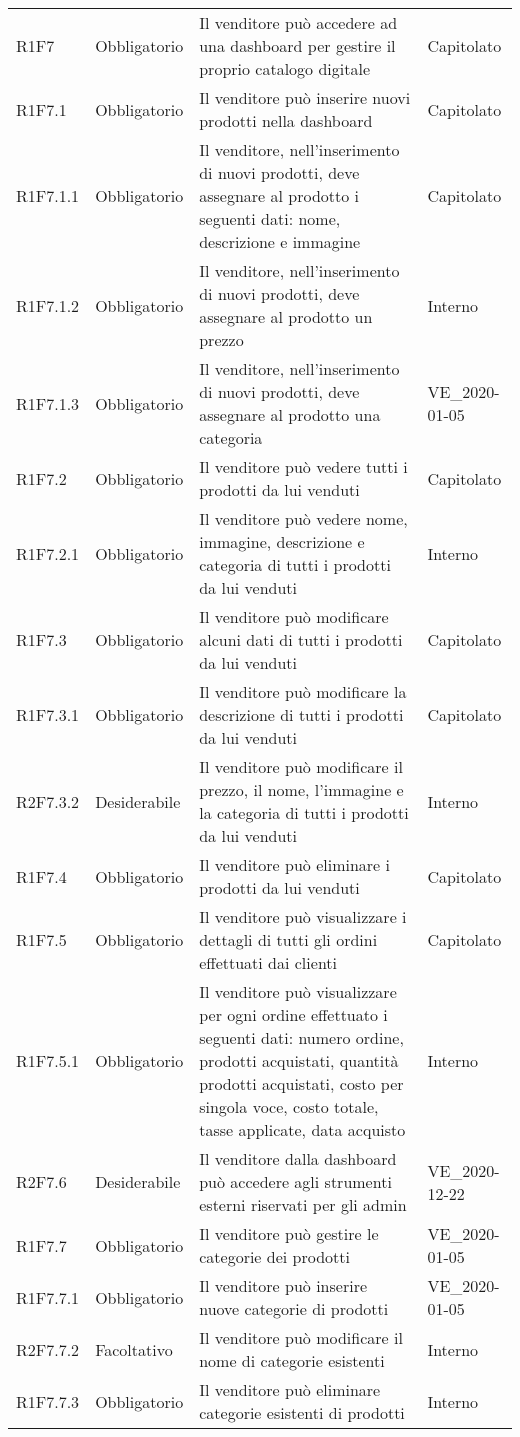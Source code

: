 {\begin{longtable}{C{2.5cm} C{2.8cm} C{6.7cm} C{2.5cm}}
R1F7 & Obbligatorio & Il venditore può accedere ad una dashboard per gestire il proprio catalogo digitale & Capitolato \\
R1F7.1 & Obbligatorio & Il venditore può inserire nuovi prodotti nella dashboard & Capitolato \\
R1F7.1.1 & Obbligatorio & Il venditore, nell'inserimento di nuovi prodotti, deve assegnare al prodotto i seguenti dati: nome, descrizione e immagine & Capitolato \\
R1F7.1.2 & Obbligatorio & Il venditore, nell'inserimento di nuovi prodotti, deve assegnare al prodotto un prezzo & Interno \\ 
R1F7.1.3 & Obbligatorio & Il venditore, nell'inserimento di nuovi prodotti, deve assegnare al prodotto una categoria & VE\_2020-01-05 \\ 
R1F7.2 & Obbligatorio & Il venditore può vedere tutti i prodotti da lui venduti & Capitolato \\
R1F7.2.1 & Obbligatorio & Il venditore può vedere nome, immagine, descrizione e categoria di tutti i prodotti da lui venduti & Interno \\
R1F7.3 & Obbligatorio & Il venditore può modificare alcuni dati di tutti i prodotti da lui venduti & Capitolato \\
R1F7.3.1 & Obbligatorio & Il venditore può modificare la descrizione di tutti i prodotti da lui venduti & Capitolato \\
R2F7.3.2 & Desiderabile & Il venditore può modificare il prezzo, il nome, l'immagine e la categoria di tutti i prodotti da lui venduti & Interno \\
R1F7.4 & Obbligatorio & Il venditore può eliminare i prodotti da lui venduti & Capitolato \\
R1F7.5 & Obbligatorio & Il venditore può visualizzare i dettagli di tutti gli ordini effettuati dai clienti & Capitolato \\
R1F7.5.1 & Obbligatorio & Il venditore può visualizzare per ogni ordine effettuato i seguenti dati: numero ordine, prodotti acquistati, quantità prodotti acquistati, costo per singola voce, costo totale, tasse applicate, data acquisto & Interno \\
R2F7.6 & Desiderabile & Il venditore dalla dashboard può accedere agli strumenti esterni riservati per gli admin & VE\_2020-12-22 \\
R1F7.7 & Obbligatorio & Il venditore può gestire le categorie dei prodotti & VE\_2020-01-05 \\
R1F7.7.1 & Obbligatorio & Il venditore può inserire nuove categorie di prodotti & VE\_2020-01-05 \\
R2F7.7.2 & Facoltativo & Il venditore può modificare il nome di categorie esistenti & Interno \\
R1F7.7.3 & Obbligatorio & Il venditore può eliminare categorie esistenti di prodotti & Interno \\


\end{longtable}}
